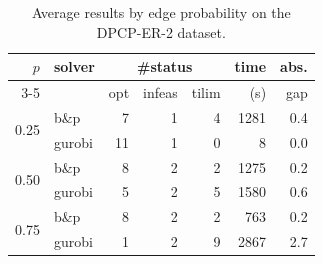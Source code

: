 \documentclass[preprint, 11pt, authoryear]{elsarticle}
\begin{document}
\begin{table}

\centering
\small
\setlength{\tabcolsep}{5pt}
\begin{tabular}{rlrrrrr}
\toprule
$p$ & solver & \multicolumn{3}{c}{\#status} & time & abs.  \\
\cmidrule(lr){3-5}
 &  & opt & infeas & tilim & (s) & gap \\
\midrule
\multirow{2}{*}{0.25} & b\&p & 7 & 1 & 4 & 1281 & 0.4 \\
 & gurobi & 11 & 1 & 0 & 8 & 0.0 \\
\midrule
\multirow{2}{*}{0.50} & b\&p & 8 & 2 & 2 & 1275 & 0.2 \\
& gurobi & 5 & 2 & 5 & 1580 & 0.6 \\
\midrule
\multirow{2}{*}{0.75} & b\&p & 8 & 2 & 2 & 763 & 0.2 \\
& gurobi & 1 & 2 & 9 & 2867 & 2.7 \\
\bottomrule
\end{tabular}

\caption{Average results by edge probability on the DPCP-ER-2 dataset.}
\label{table.results.byp}
\end{table}
\end{document}

